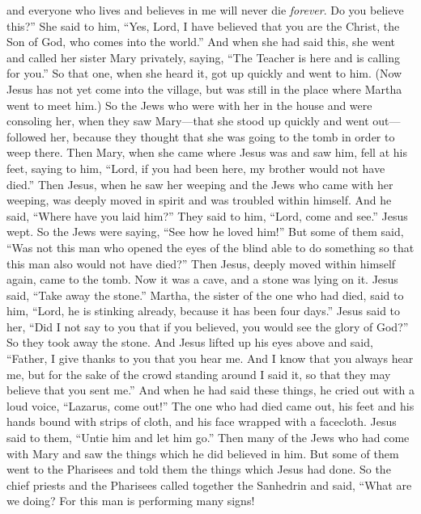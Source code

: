 \begin{biblechapter}
\verse and everyone who lives and believes in me will never die \textit{forever}. Do you believe this?”
\verse She said to him, “Yes, Lord, I have believed that you are the Christ, the Son of God, who comes into the world.”
 And when she had said this, she went and called her sister Mary privately, saying, “The Teacher is here and is calling for you.”
\verse So that one, when she heard it, got up quickly and went to him.
\verse (Now Jesus has not yet come into the village, but was still in the place where Martha went to meet him.)
\verse So the Jews who were with her in the house and were consoling her, when they saw Mary—that she stood up quickly and went out—followed her, because they thought that she was going to the tomb in order to weep there.
\verse Then Mary, when she came where Jesus was and saw him, fell at his feet, saying to him, “Lord, if you had been here, my brother would not have died.”
\verse Then Jesus, when he saw her weeping and the Jews who came with her weeping, was deeply moved in spirit and was troubled within himself.
\verse And he said, “Where have you laid him?” They said to him, “Lord, come and see.”
\verse Jesus wept.
\verse So the Jews were saying, “See how he loved him!”
\verse But some of them said, “Was not this man who opened the eyes of the blind able to do something so that this man also would not have died?”
 Then Jesus, deeply moved within himself again, came to the tomb. Now it was a cave, and a stone was lying on it.
\verse Jesus said, “Take away the stone.” Martha, the sister of the one who had died, said to him, “Lord, he is stinking already, because it has been four days.”
\verse Jesus said to her, “Did I not say to you that if you believed, you would see the glory of God?”
\verse So they took away the stone. And Jesus lifted up his eyes above and said, “Father, I give thanks to you that you hear me.
\verse And I know that you always hear me, but for the sake of the crowd standing around I said it, so that they may believe that you sent me.”
\verse And when he had said these things, he cried out with a loud voice, “Lazarus, come out!”
\verse The one who had died came out, his feet and his hands bound with strips of cloth, and his face wrapped with a facecloth. Jesus said to them, “Untie him and let him go.”
 Then many of the Jews who had come with Mary and saw the things which he did believed in him.
\verse But some of them went to the Pharisees and told them the things which Jesus had done.
\verse So the chief priests and the Pharisees called together the Sanhedrin and said, “What are we doing? For this man is performing many signs!

\end{biblechapter}
